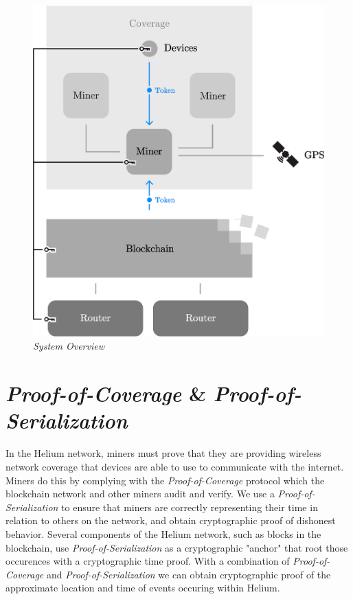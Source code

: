 \documentclass[letterpaper,11pt]{article}
\def\proofofcoverage/{\emph{Proof-of-Coverage}}
\begin{document}
\begin{figure}[H]
	\begin{center}
  		\includegraphics[width=\textwidth]{diagram1.eps}
  		\caption{\emph{System Overview}}
  		\label{fig:system}
 	\end{center}
\end{figure}

\newpage

\section{\proofofcoverage/ \& \emph{Proof-of-Serialization}} \label{poc}

In the Helium network, miners must prove that they are providing wireless network coverage that devices are able to use to communicate with the internet. Miners do this by complying with the \emph{Proof-of-Coverage} protocol which the blockchain network and other miners audit and verify. We use a \emph{Proof-of-Serialization} to ensure that miners are correctly representing their time in relation to others on the network, and obtain cryptographic proof of dishonest behavior. Several components of the Helium network, such as blocks in the blockchain, use \emph{Proof-of-Serialization} as a cryptographic "anchor" that root those occurences  with a cryptographic time proof. With a combination of \proofofcoverage/ and \emph{Proof-of-Serialization} we can obtain cryptographic proof of the approximate location and time of events occuring within Helium. \newline
\end{document}
